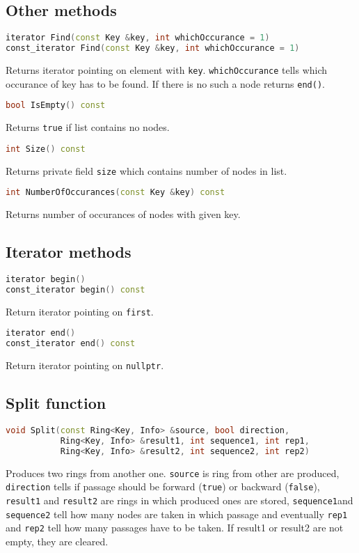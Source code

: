 \documentclass{article}
\begin{document}
\subsection{Other methods}

\begin{lstlisting}[language=C++]
iterator Find(const Key &key, int whichOccurance = 1)
const_iterator Find(const Key &key, int whichOccurance = 1)
\end{lstlisting}
Returns iterator pointing on element with {\tt key}. {\tt whichOccurance}
tells which occurance of key has to be found. If there is no such a node returns {\tt end()}.

\begin{lstlisting}[language=C++]
bool IsEmpty() const
\end{lstlisting}
Returns {\tt true} if list contains no nodes.

\begin{lstlisting}[language=C++]
int Size() const
\end{lstlisting}
Returns private field {\tt size} which contains number of nodes in list.

\begin{lstlisting}[language=C++]
int NumberOfOccurances(const Key &key) const
\end{lstlisting}
Returns number of occurances of nodes with given key.
\vspace{\baselineskip}

\subsection{Iterator methods}

\begin{lstlisting}[language=C++]
iterator begin()
const_iterator begin() const
\end{lstlisting}
Return iterator pointing on {\tt first}.

\begin{lstlisting}[language=C++]
iterator end()
const_iterator end() const
\end{lstlisting}
Return iterator pointing on {\tt nullptr}.
\vspace{\baselineskip}

\subsection{Split function}

\begin{lstlisting}[language=C++]
void Split(const Ring<Key, Info> &source, bool direction,
           Ring<Key, Info> &result1, int sequence1, int rep1,
           Ring<Key, Info> &result2, int sequence2, int rep2)
\end{lstlisting}
Produces two rings from another one. {\tt source} is ring from other are produced, 
{\tt direction} tells if passage should be forward ({\tt true}) or backward ({\tt false}),
{\tt result1} and {\tt result2} are rings in which produced ones are stored,
{\tt sequence1}and {\tt sequence2} tell how many nodes are taken in which passage
and eventually {\tt rep1} and {\tt rep2} tell how many passages have to be taken.
If result1 or result2 are not empty, they are cleared.
\newpage
\end{document}
